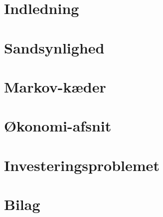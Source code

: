 

 




\chapter{Indledning} 
    

\chapter{Sandsynlighed}\label{kapitel:sandsynlighed}


%

\chapter{Markov-kæder}\label{Kap:MArkov-kæder}

\chapter{Økonomi-afsnit}

\chapter{Investeringsproblemet}



\chapter{Bilag}
    


\cite{hoel1986introduction}
\cite{kaas2008modern}
\cite{oxford}


